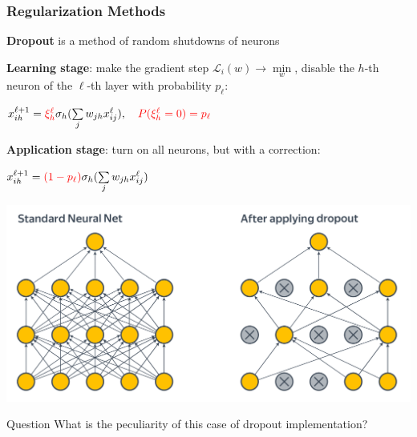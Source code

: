 \documentclass[fullscreen=true, bookmarks=true, hyperref={pdfencoding=unicode}]{beamer}
\begin{document}
\begin{frame}
\frametitle{Regularization Methods}

   \pause
   {\bf Dropout} is a method of random shutdowns of neurons

   \pause
   {\bf Learning stage}: make the gradient step $\mathcal{L}_i(w) \to \min\limits_w$, disable the $h$-th neuron of the $\ell$-th layer with probability $p_\ell$:

   $x_{ih}^{\ell + 1} = {\color{red}\xi_h^\ell} \sigma_h (\sum\limits_j w_{jh} x_{ij}^\ell), \ \ \
    {\color{red}P(\xi_h^\ell = 0) = p_\ell}$

   \pause
   {\bf Application stage}: turn on all neurons, but with a correction:

   $x_{ih}^{\ell + 1} = {\color{red}(1 - p_\ell)} \sigma_h(\sum\limits_j w_{jh} x_{ij}^\ell)$

   \pause
   \begin{center}
     \includegraphics[keepaspectratio,
                      width=.6\paperwidth]{dropout_shad.png}
   \end{center}


\end{frame}


\begin{frame}
    \begin{block}{Question}
    What is the peculiarity of this case of dropout implementation?
    \end{block}
\end{frame}
\end{document}
